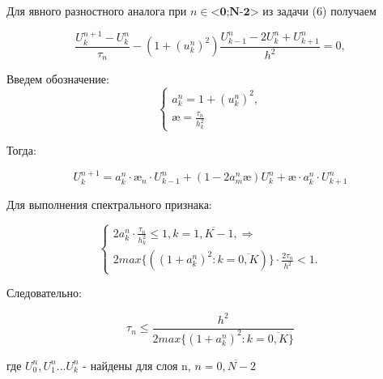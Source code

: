 \documentclass[__main__.tex]{subfiles}
\begin{document}
Для явного разностного аналога при $n \in \textbf{<0;N-2>}$ из задачи (6) получаем 

\begin{equation} \label{42.7}
\frac{U^{n+1}_k - U^{n}_k}{\tau_n} - (1 + (u^n_k)^2)\frac{U^{n}_{k-1} - 2U^{n}_k + U^n_{k+1}}{h^2} = 0,
\end{equation} 

Введем обозначение:
 \begin{equation} \label{42.8}
 \begin{cases}
 a^n_k = 1 + (u^n_k)^2, \\
 \text{\ae} = \frac{\tau_n}{h^2_k}
 \end{cases}
 \end{equation} 
 
Тогда:

 \begin{equation} \label{42.9}
U^{n+1}_k = a^n_k \cdot \text{\ae}_n \cdot U^n_{k-1} + (1 - 2a^n_m \text{\ae})U^n_k + \text{\ae} \cdot a^n_k \cdot U^n_{k+1}
\end{equation} 
 
 Для выполнения спектрального признака:
 
 \begin{equation} \label{42.10}
 \begin{cases}
  2a^n_k \cdot \frac{\tau_n}{h^2_k} \leq 1, k = \overline{1,K-1}, \Rightarrow \\
  2max \{((1 + a^n_k)^2:  k = \overline{0,K})\} \cdot \frac{2\tau_n}{h^2} < 1.
  \end{cases}
 \end{equation} 
 
 Следовательно:
 
 \begin{equation} \label{42.11}
 \tau_n \leq \frac{h^2}{2max \{(1 + a^n_k)^2:  k = \overline{0,K}\}}
 \end{equation} 
 
 где $U^n_0, U^n_1 ... U^n_k$ - найдены для слоя n, $n = \overline{0,N-2}$
 
\end{document}

